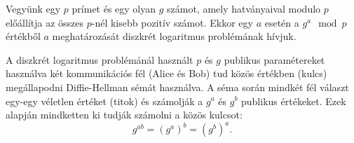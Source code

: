 \begin{definition}
  Vegyünk egy $p$ prímet és egy olyan $g$ számot, amely hatványaival modulo $p$ előállítja az
  összes $p$-nél kisebb pozitív számot. Ekkor egy $a$ esetén a $g^a\mod p$ értékből $a$
  meghatározását diszkrét logaritmus problémának hívjuk.
\end{definition}

\begin{definition}
  A diszkrét logaritmus problémánál használt $p$ és $g$ publikus paramétereket használva két
  kommunikációs fél (Alice és Bob) tud közös értékben (kulcs) megállapodni Diffie-Hellman
  sémát használva. A séma során mindkét fél választ egy-egy véletlen értéket (titok) és számolják a
  $g^a$ és $g^b$ publikus értékeket. Ezek alapján mindketten ki tudják számolni a közös kulcsot:
  \[g^{ab} = (g^a)^b = (g^b)^a.\]
\end{definition}

